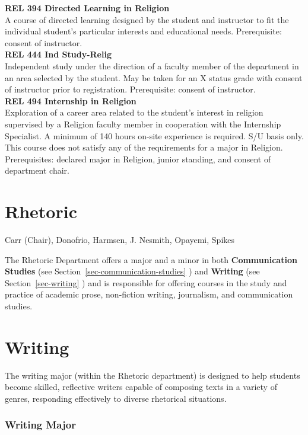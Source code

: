 \documentclass[
  letterpaper,
]{scrbook}
\begin{document}
\textbf{REL 394 Directed Learning in Religion}\\
A course of directed learning designed by the student and instructor to
fit the individual student's particular interests and educational needs.
Prerequisite: consent of instructor.\\
\textbf{REL 444 Ind Study-Relig}\\
Independent study under the direction of a faculty member of the
department in an area selected by the student. May be taken for an X
status grade with consent of instructor prior to registration.
Prerequisite: consent of instructor.\\
\textbf{REL 494 Internship in Religion}\\
Exploration of a career area related to the student's interest in
religion supervised by a Religion faculty member in cooperation with the
Internship Specialist. A minimum of 140 hours on-site experience is
required. S/U basis only. This course does not satisfy any of the
requirements for a major in Religion. Prerequisites: declared major in
Religion, junior standing, and consent of department chair.

\section{Rhetoric}\label{sec-rhetoric}

Carr (Chair), Donofrio, Harmsen, J. Nesmith, Opayemi, Spikes

The Rhetoric Department offers a major and a minor in both
\textbf{Communication Studies} (see
Section~\ref{sec-communication-studies} ) and \textbf{Writing} (see
Section~\ref{sec-writing} ) and is responsible for offering courses in
the study and practice of academic prose, non-fiction writing,
journalism, and communication studies.

\section{Writing}\label{writing}

The writing major (within the Rhetoric department) is designed to help
students become skilled, reflective writers capable of composing texts
in a variety of genres, responding effectively to diverse rhetorical
situations.

\subsubsection{Writing Major}\label{writing-major}
\end{document}
